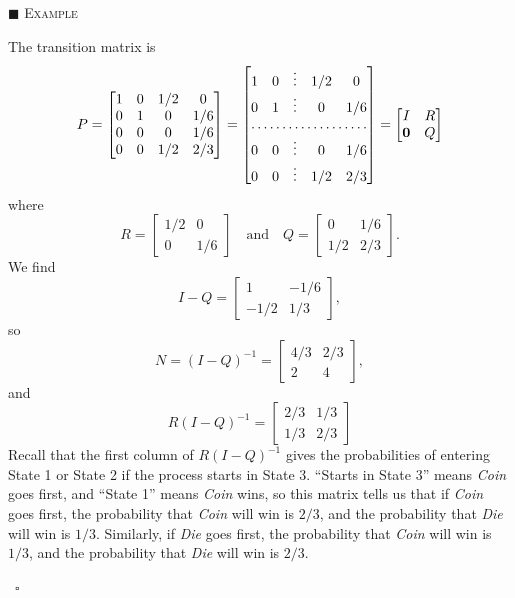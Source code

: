\documentclass[reqno]{immbook}
\numberwithin{equation}{chapter}
\numberwithin{question}{section}
\numberwithin{theorem}{chapter}
\numberwithin{figure}{chapter}
\theoremstyle{definition}
\newenvironment{xexample}%
{%

\medskip\noindent\addtocounter{example}{1}$\blacksquare$ \textsc{Example \theexample}\hspace*{1em}%
}%
{%
~\hfill$\square$

\medskip
}
\begin{document}
\begin{xexample}
The transition matrix is
\begin{equation}
 P = \begin{bmatrix}
         1 & 0 & 1/2 &  0  \\
	 0 & 1 &  0  & 1/6 \\
	 0 & 0 &  0  & 1/6 \\
	 0 & 0 & 1/2 & 2/3 
     \end{bmatrix}
   = \begin{bmatrix}
         1 & 0 & \vdots & 1/2 &  0  \\
	 0 & 1 & \vdots &  0  & 1/6 \\
	 \hdotsfor{5} \\
	 0 & 0 & \vdots &  0  & 1/6 \\
	 0 & 0 & \vdots & 1/2 & 2/3 
     \end{bmatrix}
   = \begin{bmatrix}
         I & R \\
	 \textbf{0} & Q 
     \end{bmatrix}
\end{equation}
where
\begin{equation}
  R = \begin{bmatrix}
            1/2 & 0 \\
	     0  & 1/6
      \end{bmatrix}
  \quad\textrm{and}\quad
  Q = \begin{bmatrix}
            0 & 1/6 \\
	    1/2 & 2/3
      \end{bmatrix}.
\end{equation}
We find
\begin{equation}
  I-Q = \begin{bmatrix}
            1  & -1/6 \\
	  -1/2 & 1/3 
        \end{bmatrix},
\end{equation}
so
\begin{equation}
  N = (I-Q)^{-1} = \begin{bmatrix}
                 4/3 & 2/3 \\
		 2   &  4
               \end{bmatrix},
\label{eqn:CDN}
\end{equation}
and
\begin{equation}
  R(I-Q)^{-1} = \begin{bmatrix}
                   2/3 & 1/3 \\
		   1/3 & 2/3
                \end{bmatrix}
\end{equation}
Recall that the first column of $R(I-Q)^{-1}$
gives the probabilities of entering State 1 or
State 2 if the process starts in State 3.
``Starts in State 3'' means \emph{Coin} goes first,
and ``State 1'' means \emph{Coin} wins,
so this matrix tells us that if \emph{Coin} goes
first, the probability that \emph{Coin} will win
is $2/3$, and the probability that
\emph{Die} will win is $1/3$.
Similarly, if \emph{Die} goes first,
the probability that \emph{Coin} will win
is $1/3$, and the probability that
\emph{Die} will win is $2/3$.


\end{xexample}
\end{document}
